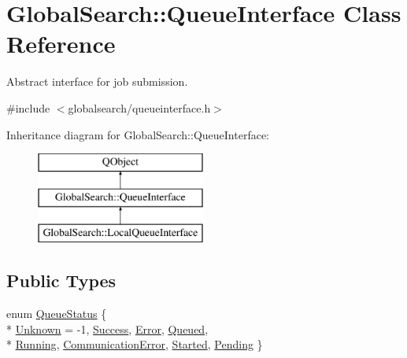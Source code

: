 \hypertarget{classGlobalSearch_1_1QueueInterface}{\section{Global\-Search\-:\-:Queue\-Interface Class Reference}
\label{classGlobalSearch_1_1QueueInterface}
}


Abstract interface for job submission.  




{\ttfamily \#include $<$globalsearch/queueinterface.\-h$>$}

Inheritance diagram for Global\-Search\-:\-:Queue\-Interface\-:\begin{figure}[H]
\begin{center}
\leavevmode
\includegraphics[height=3.000000cm]{classGlobalSearch_1_1QueueInterface}
\end{center}
\end{figure}
\subsection*{Public Types}
\begin{DoxyCompactItemize}
\item 
enum \hyperlink{classGlobalSearch_1_1QueueInterface_a08dcf06d1b99f6333472470490ca9a6d}{Queue\-Status} \{ \\*
\hyperlink{classGlobalSearch_1_1QueueInterface_a08dcf06d1b99f6333472470490ca9a6da4960b69e5e05b425331bba80e5b59e20}{Unknown} = -\/1, 
\hyperlink{classGlobalSearch_1_1QueueInterface_a08dcf06d1b99f6333472470490ca9a6da4be480247388114f3860f7e746df65e9}{Success}, 
\hyperlink{classGlobalSearch_1_1QueueInterface_a08dcf06d1b99f6333472470490ca9a6dabaf3f4a536a56b3a2ac6643de3e4689f}{Error}, 
\hyperlink{classGlobalSearch_1_1QueueInterface_a08dcf06d1b99f6333472470490ca9a6da4c4e184400d3f455f263dc029217fc9a}{Queued}, 
\\*
\hyperlink{classGlobalSearch_1_1QueueInterface_a08dcf06d1b99f6333472470490ca9a6da46d29e0584d720fdb20334913c0a5822}{Running}, 
\hyperlink{classGlobalSearch_1_1QueueInterface_a08dcf06d1b99f6333472470490ca9a6da96ca4ddb429576d197eefe0e6b3a3a98}{Communication\-Error}, 
\hyperlink{classGlobalSearch_1_1QueueInterface_a08dcf06d1b99f6333472470490ca9a6dad54b02ac97bb4a875b105a31489f7aa7}{Started}, 
\hyperlink{classGlobalSearch_1_1QueueInterface_a08dcf06d1b99f6333472470490ca9a6da08ea952b51a67578345517c853e66801}{Pending}
 \}
\end{DoxyCompactItemize}
